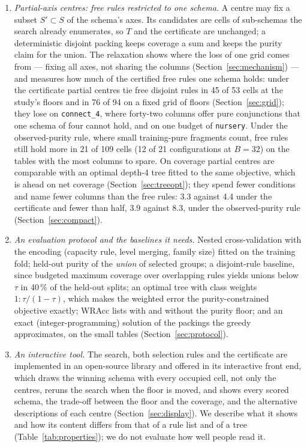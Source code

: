 \documentclass[11pt]{article}
\begin{document}
\begin{enumerate}
\item \emph{Partial-axis centres: free rules restricted to one schema.} A centre may fix a subset $S'\subset S$ of the schema's axes. Its candidates are cells of sub-schemas the search already enumerates, so $T$ and the certificate are unchanged; a deterministic disjoint packing keeps coverage a sum and keeps the purity claim for the union. The relaxation shows where the loss of one grid comes from --- fixing all axes, not sharing the columns (Section~\ref{sec:mechanism}) --- and measures how much of the certified free rules one schema holds: under the certificate partial centres tie free disjoint rules in 45 of 53 cells at the study's floors and in 76 of 94 on a fixed grid of floors (Section~\ref{sec:grid}); they lose on \texttt{connect\_4}, where forty-two columns offer pure conjunctions that one schema of four cannot hold, and on one budget of \texttt{nursery}. Under the observed-purity rule, where small training-pure fragments count, free rules still hold more in 21 of 109 cells (12 of 21 configurations at $B=32$) on the tables with the most columns to spare. On coverage partial centres are comparable with an optimal depth-4 tree fitted to the same objective, which is ahead on net coverage (Section~\ref{sec:treeopt}); they spend fewer conditions and name fewer columns than the free rules: 3.3 against 4.4 under the certificate and fewer than half, 3.9 against 8.3, under the observed-purity rule (Section~\ref{sec:compact}).
\item \emph{An evaluation protocol and the baselines it needs.} Nested cross-validation with the encoding (capacity rule, level merging, family size) fitted on the training fold; held-out purity of the \emph{union} of selected groups; a disjoint-rule baseline, since budgeted maximum coverage over overlapping rules yields unions below $\tau$ in 40\,\% of the held-out splits; an optimal tree with class weights $1:\tau/(1-\tau)$, which makes the weighted error the purity-constrained objective exactly; WRAcc lists with and without the purity floor; and an exact (integer-programming) solution of the packings the greedy approximates, on the small tables (Section~\ref{sec:protocol}).
\item \emph{An interactive tool.} The search, both selection rules and the certificate are implemented in an open-source library and offered in its interactive front end, which draws the winning schema with every occupied cell, not only the centres, reruns the search when the floor is moved, and shows every scored schema, the trade-off between the floor and the coverage, and the alternative descriptions of each centre (Section~\ref{sec:display}). We describe what it shows and how its content differs from that of a rule list and of a tree (Table~\ref{tab:properties}); we do not evaluate how well people read it.
\end{enumerate}
\end{document}
